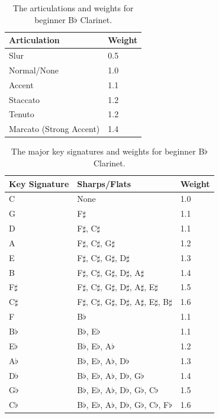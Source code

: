 \documentclass[10pt,preprint]{sigplanconf}
\begin{document}
{\begin{table}[]
	\centering
    \begin{tabular}{| l | l |}
        \hline
        Articulation & Weight \\ \hline
        Slur & 0.5 \\ \hline
        Normal/None & 1.0 \\ \hline
        Accent & 1.1 \\ \hline
        Staccato & 1.2 \\ \hline
        Tenuto & 1.2 \\ \hline
        Marcato (Strong Accent) & 1.4 \\
        \hline
    \end{tabular}
	\caption{The articulations and weights for beginner B$\flat$ Clarinet.}
	\label{table:articulations}
\end{table}

\begin{table}[]
	\centering
    \begin{tabular}{| l | l | l |}
        \hline
        Key Signature & Sharps/Flats & Weight \\ \hline
        C & None & 1.0 \\ \hline
        G & F$\sharp$ & 1.1 \\ \hline 
        D & F$\sharp$, C$\sharp$ & 1.1 \\ \hline
        A & F$\sharp$, C$\sharp$, G$\sharp$ & 1.2 \\ \hline
        E & F$\sharp$, C$\sharp$, G$\sharp$, D$\sharp$ & 1.3 \\ \hline
        B & F$\sharp$, C$\sharp$, G$\sharp$, D$\sharp$, A$\sharp$ & 1.4 \\ \hline
        F$\sharp$ & F$\sharp$, C$\sharp$, G$\sharp$, D$\sharp$, A$\sharp$, E$\sharp$ & 1.5 \\ \hline
        C$\sharp$ & F$\sharp$, C$\sharp$, G$\sharp$, D$\sharp$, A$\sharp$, E$\sharp$, B$\sharp$ & 1.6 \\ \hline
        F & B$\flat$ & 1.1 \\ \hline
        B$\flat$ & B$\flat$, E$\flat$ & 1.1 \\ \hline
        E$\flat$ & B$\flat$, E$\flat$, A$\flat$ & 1.2 \\ \hline
        A$\flat$ & B$\flat$, E$\flat$, A$\flat$, D$\flat$ & 1.3 \\ \hline
        D$\flat$ & B$\flat$, E$\flat$, A$\flat$, D$\flat$, G$\flat$ & 1.4 \\ \hline
        G$\flat$ & B$\flat$, E$\flat$, A$\flat$, D$\flat$, G$\flat$, C$\flat$ & 1.5 \\ \hline
        C$\flat$ & B$\flat$, E$\flat$, A$\flat$, D$\flat$, G$\flat$, C$\flat$, F$\flat$ & 1.6 \\
        \hline
    \end{tabular}
	\caption{The major key signatures and weights for beginner B$\flat$ Clarinet.}
	\label{table:key}
\end{table}



}
\end{document}
